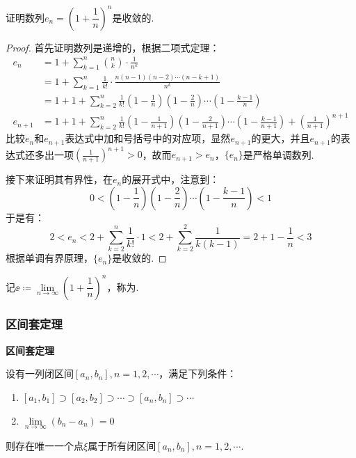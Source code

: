 \begin{question}
    证明数列$e_n=\left(1+\dfrac{1}{n}\right)^n$是收敛的.
\end{question}
\begin{proof}
    首先证明数列是递增的，根据二项式定理：
    \begin{align*}
        e_n &= 1 + \sum_{k=1}^n \binom{n}{k}  \cdot \frac{1}{n^k}\\
        &= 1 + \sum_{k=1}^{n}\frac{1}{k!}\cdot\frac{n(n-1)(n-2) \cdots (n-k+1)}{n^k}\\
        &= 1 + 1 + \sum_{k=2}^n\frac{1}{k!}\left(1-\frac{1}{n}\right)\left(1-\frac{2}{n}\right)\cdots\left(1-\frac{k-1}{n}\right) \\
        e_{n+1} &= 1 + 1 + \sum_{k=2}^n\frac{1}{k!}\left(1-\frac{1}{n+1}\right)\left(1-\frac{2}{n+1}\right)\cdots\left(1-\frac{k-1}{n+1}\right) + \left(\frac{1}{n+1}\right)^{n+1}
    \end{align*}
    比较$e_n$和$e_{n+1}$表达式中加和号括号中的对应项，显然$e_{n+1}$的更大，并且$e_{n+1}$的表达式还多出一项$\left(\frac{1}{n+1}\right)^{n+1}>0$，故而$e_{n+1}>e_n$，$\{e_n\}$是严格单调数列.

    接下来证明其有界性，在$e_n$的展开式中，注意到：
    \[0 < \left(1-\frac{1}{n}\right)\left(1-\frac{2}{n}\right)\cdots\left(1-\frac{k-1}{n}\right) < 1\]
    于是有：
    \[2 < e_n < 2 + \sum_{k=2}^n \frac{1}{k!} \cdot 1 < 2+\sum_{k=2}^2\frac{1}{k(k-1)} = 2 + 1 - \frac{1}{n} < 3\]
    根据单调有界原理，$\{e_n\}$是收敛的.
\end{proof}
\begin{definition}
    记$\ee \coloneq \lim\limits_{n \to \infty}\left(1+\dfrac{1}{n}\right)^n$，称为.
\end{definition}


\subsubsection{区间套定理}
\begin{theorem}
    \textbf{区间套定理}

    设有一列闭区间$[a_n, b_n],n=1,2,\cdots$，满足下列条件：
    \begin{enumerate}[circ]
        \item $[a_1,b_1]\supset[a_2,b_2]\supset\cdots\supset[a_n,b_n]\supset\cdots$
        \item $\lim\limits_{n \to \infty}(b_n-a_n) = 0$
    \end{enumerate}
    则存在唯一一个点$\xi$属于所有闭区间$[a_n, b_n],n=1,2,\cdots$.
\end{theorem}

